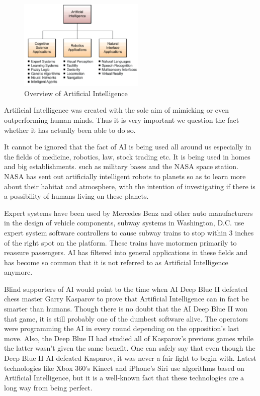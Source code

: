 \documentclass[conference,compsoc]{IEEEtran}
\begin{document}
\begin{figure}[H]
    \centering
    \includegraphics[width=6cm]{images/ai-overview.png}
    \caption{Overview of Artificial Intelligence}
    \label{fig:ai-overview}
\end{figure}

Artificial Intelligence was created with the sole aim of mimicking or even outperforming human minds. Thus it is very important we question the fact whether it has actually been able to do so.

It cannot be ignored that the fact of AI is being used all around us especially in the fields of medicine, robotics, law, stock trading etc. It is being used in homes and big establishments. such as military bases and the NASA space station. NASA has sent out artificially intelligent robots to planets so as to learn more about their habitat and atmosphere, with the intention of investigating if there is a possibility of humans living on these planets.

Expert systems have been used by Mercedes Benz and other auto manufacturers in the design of vehicle components, subway systems in Washington, D.C. use expert system software controllers to cause subway trains to stop within 3 inches of the right spot on the platform. These trains have motormen primarily to reassure passengers. AI has filtered into general applications in these fields and has become so common that it is not referred to as Artificial Intelligence anymore.

Blind supporters of AI would point to the time when AI Deep Blue II defeated chess master Garry Kasparov to prove that Artificial Intelligence can in fact be smarter than humans. Though there is no doubt that the AI Deep Blue II won that game, it is still probably one of the dumbest software alive. The operators were programming the AI in every round depending on the opposition’s last move. Also, the Deep Blue II had studied all of Kasparov’s previous games while the latter wasn’t given the same benefit. One can safely say that even though the Deep Blue II AI defeated Kasparov, it was never a fair fight to begin with. Latest technologies like Xbox 360’s Kinect and iPhone’s Siri use algorithms based on Artificial Intelligence, but it is a well-known fact that these technologies are a long way from being perfect.
\end{document}
